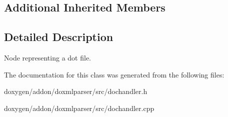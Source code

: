\subsection*{Additional Inherited Members}


\subsection{Detailed Description}
Node representing a dot file. 



The documentation for this class was generated from the following files\+:\begin{DoxyCompactItemize}
\item 
doxygen/addon/doxmlparser/src/dochandler.\+h\item 
doxygen/addon/doxmlparser/src/dochandler.\+cpp\end{DoxyCompactItemize}
